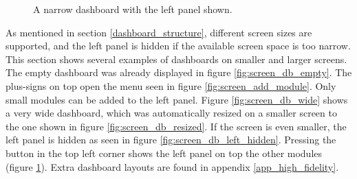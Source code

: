         \begin{figure}[!t]
            \centering
            \caption{A narrow dashboard with the left panel shown.}\label{fig:screen_db_left_shown}
        \end{figure}

        As mentioned in section \ref{dashboard_structure}, different screen sizes are supported, and the left panel is hidden if the available screen space is too narrow. This section shows several examples of dashboards on smaller and larger screens. The empty dashboard was already displayed in figure \ref{fig:screen_db_empty}. The plus-signs on top open the menu seen in figure \ref{fig:screen_add_module}. Only small modules can be added to the left panel. Figure \ref{fig:screen_db_wide} shows a very wide dashboard, which was automatically resized on a smaller screen to the one shown in figure \ref{fig:screen_db_resized}. If the screen is even smaller, the left panel is hidden as seen in figure \ref{fig:screen_db_left_hidden}. Pressing the button in the top left corner shows the left panel on top the other modules (figure \ref{fig:screen_db_left_shown}). Extra dashboard layouts are found in appendix \ref{app_high_fidelity}.